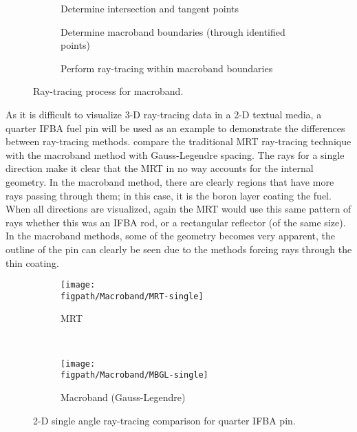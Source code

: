 {{{      \begin{figure}[ht]
        \centering
        \begin{subfigure}[t]{0.33\linewidth}
          \centering
          \def\svgwidth{0.95\linewidth}
          
          \caption{Determine intersection and tangent points}
        \end{subfigure}%
        \hfill
        \begin{subfigure}[t]{0.33\linewidth}
          \centering
          \def\svgwidth{0.95\linewidth}
          
          \caption{Determine macroband boundaries (through identified points)}
        \end{subfigure}%
        \hfill
        \begin{subfigure}[t]{0.33\linewidth}
          \centering
          \def\svgwidth{0.95\linewidth}
          
          \caption{Perform ray-tracing within macroband boundaries}
        \end{subfigure}
        \caption{Ray-tracing process for macroband.}
        \label{fig:MR:Macroband Process}
      \end{figure}

      As it is difficult to visualize 3-D ray-tracing data in a 2-D textual media, a quarter \ac{IFBA} fuel pin will be used as an example to demonstrate the differences between ray-tracing methods.
       compare the traditional \ac{MRT} ray-tracing technique with the macroband method with Gauss-Legendre spacing.
      The rays for a single direction make it clear that the \ac{MRT} in no way accounts for the internal geometry.
      In the macroband method, there are clearly regions that have more rays passing through them; in this case, it is the boron layer coating the fuel.
      When all directions are visualized, again the \ac{MRT} would use this same pattern of rays whether this was an \ac{IFBA} rod, or a rectangular reflector (of the same size).
      In the macroband methods, some of the geometry becomes very apparent, the outline of the pin can clearly be seen due to the methods forcing rays through the thin coating.

      \begin{figure}[htbp]
        \centering
        \begin{subfigure}[t]{0.33\textwidth}
          \centering
          \texttt{[image: \\figpath/Macroband/MRT-single]}
          \caption{MRT}
        \end{subfigure}%
        ~
        \begin{subfigure}[t]{0.33\textwidth}
          \centering
          \texttt{[image: \\figpath/Macroband/MBGL-single]}
          \caption{Macroband (Gauss-Legendre)}
        \end{subfigure}
        \caption{2-D single angle ray-tracing comparison for quarter IFBA pin. \label{figs:MR:Macroband-Single-Visualization}}
      \end{figure}

}}}

